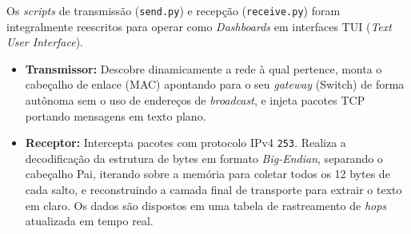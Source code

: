 Os \textit{scripts} de transmissão (\texttt{send.py}) e recepção (\texttt{receive.py}) foram integralmente reescritos para operar como \textit{Dashboards} em interfaces TUI (\textit{Text User Interface}).

\begin{itemize}
    \item \textbf{Transmissor:} Descobre dinamicamente a rede à qual pertence, monta o cabeçalho de enlace (MAC) apontando para o seu \textit{gateway} (Switch) de forma autônoma sem o uso de endereços de \textit{broadcast}, e injeta pacotes TCP portando mensagens em texto plano.
    \item \textbf{Receptor:} Intercepta pacotes com protocolo IPv4 \texttt{253}. Realiza a decodificação da estrutura de bytes em formato \textit{Big-Endian}, separando o cabeçalho Pai, iterando sobre a memória para coletar todos os 12 bytes de cada salto, e reconstruindo a camada final de transporte para extrair o texto em claro. Os dados são dispostos em uma tabela de rastreamento de \textit{hops} atualizada em tempo real.
\end{itemize}

